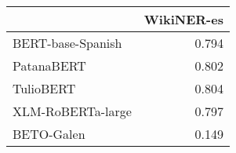 \begin{tabular}{lr}
\toprule
 & WikiNER-es \\
\midrule
BERT-base-Spanish & 0.794 \\
PatanaBERT & 0.802 \\
TulioBERT & 0.804 \\
XLM-RoBERTa-large & 0.797 \\
BETO-Galen & 0.149 \\
\bottomrule
\end{tabular}
